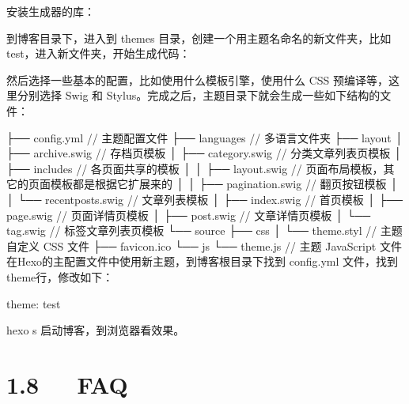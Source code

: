 \documentclass[letterpaper,12pt,english]{sphinxmanual}
\begin{document}
\begin{sphinxVerbatim}[commandchars=\\\{\}]
   
\end{sphinxVerbatim}

安装生成器的库：

\begin{sphinxVerbatim}[commandchars=\\\{\}]
   
\end{sphinxVerbatim}

到博客目录下，进入到 themes 目录，创建一个用主题名命名的新文件夹，比如test，进入新文件夹，开始生成代码：

\begin{sphinxVerbatim}[commandchars=\\\{\}]
 
\end{sphinxVerbatim}

然后选择一些基本的配置，比如使用什么模板引擎，使用什么 CSS 预编译等，这里分别选择 Swig 和 Stylus。完成之后，主题目录下就会生成一些如下结构的文件：

\begin{sphinxVerbatim}[commandchars=\\\{\}]
├── \PYGZus{}config.yml // 主题配置文件
├── languages // 多语言文件夹
├── layout
│   ├── archive.swig // 存档页模板
│   ├── category.swig // 分类文章列表页模板
│   ├── includes // 各页面共享的模板
│   │   ├── layout.swig // 页面布局模板，其它的页面模板都是根据它扩展来的
│   │   ├── pagination.swig // 翻页按钮模板
│   │   └── recent\PYGZhy{}posts.swig // 文章列表模板
│   ├── index.swig // 首页模板
│   ├── page.swig // 页面详情页模板
│   ├── post.swig // 文章详情页模板
│   └── tag.swig // 标签文章列表页模板
└── source
    ├── css
    │   └── theme.styl // 主题自定义 CSS 文件
    ├── favicon.ico
    └── js
        └── theme.js // 主题 JavaScript 文件
在Hexo的主配置文件中使用新主题，到博客根目录下找到 \PYGZus{}config.yml 文件，找到theme行，修改如下：
\end{sphinxVerbatim}

theme: test

hexo s 启动博客，到浏览器看效果。


\section{1.8   FAQ}
\label{\detokenize{001software/001install/001._u7f51_u7ad9/hexo:faq}}
\end{document}
